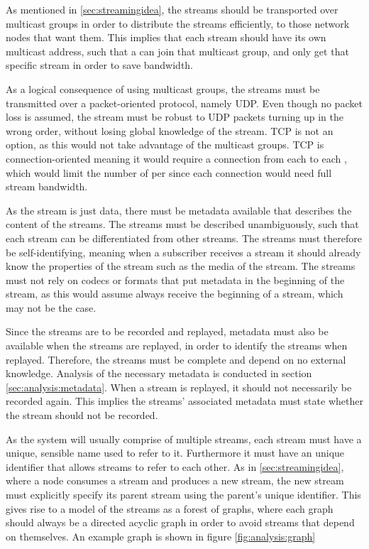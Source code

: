 As mentioned in \ref{sec:streamingidea}, the streams should be transported over multicast groups in order to distribute the streams efficiently, to those network nodes that want them.  This implies that each stream should have its own multicast address, such that a  can join that multicast group, and only get that specific stream in order to save bandwidth.

As a logical consequence of using multicast groups, the streams must be transmitted over a  packet-oriented protocol, namely UDP. Even though no packet loss is assumed, the stream must be robust to UDP packets turning up in the wrong order, without losing global knowledge of the stream. TCP is not an option, as this would not take advantage of the multicast groups. TCP is connection-oriented meaning it would require a connection from each  to each , which would limit the number of  per  since each connection would need full stream bandwidth.

As the stream is just data, there must be metadata available that describes the content of the streams. The streams must be described unambiguously, such that each stream can be differentiated from other streams. The streams must therefore be self-identifying, meaning when a subscriber receives a stream it should already know the properties of the stream such as the media of the stream. The streams must not rely on codecs or formats that put metadata in the beginning of the stream, as this would assume  always receive the beginning of a stream, which may not be the case.

Since the streams are to be recorded and replayed, metadata must also be available when the streams are replayed, in order to identify the streams when replayed. Therefore, the streams must be complete and depend on no external knowledge. Analysis of the necessary metadata is conducted in section \ref{sec:analysis:metadata}. When a stream is replayed, it should not necessarily be recorded again. This implies the streams' associated metadata must state whether the stream should not be recorded.

As the system will usually comprise of multiple streams, each stream must have a unique, sensible name used to refer to it. Furthermore it must have an unique identifier that allows streams to refer to each other.
As in \ref{sec:streamingidea}, where a node consumes a stream and produces a new stream, the new stream must explicitly specify its parent stream using the parent's unique identifier. This gives rise to a model of the streams as a forest of graphs, where each graph should always be a directed acyclic graph in order to avoid streams that depend on themselves. An example graph is shown in figure \ref{fig:analysis:graph}

